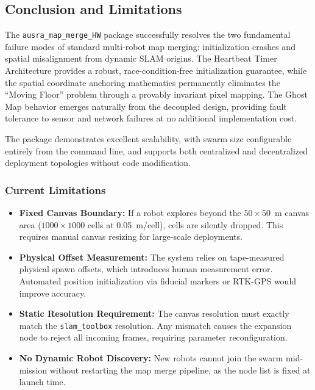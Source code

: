 \subsection{Conclusion and Limitations}
\label{subsec:map_merge_conclusion}

The \texttt{ausra\_map\_merge\_HW} package successfully resolves the two fundamental failure modes of standard multi-robot map merging: initialization crashes and spatial misalignment from dynamic SLAM origins. The Heartbeat Timer Architecture provides a robust, race-condition-free initialization guarantee, while the spatial coordinate anchoring mathematics permanently eliminates the ``Moving Floor'' problem through a provably invariant pixel mapping. The Ghost Map behavior emerges naturally from the decoupled design, providing fault tolerance to sensor and network failures at no additional implementation cost.

The package demonstrates excellent scalability, with swarm size configurable entirely from the command line, and supports both centralized and decentralized deployment topologies without code modification.

\subsubsection{Current Limitations}

\begin{itemize}
    \item \textbf{Fixed Canvas Boundary:} If a robot explores beyond the $50 \times 50$~m canvas area ($1000 \times 1000$ cells at 0.05~m/cell), cells are silently dropped. This requires manual canvas resizing for large-scale deployments.

    \item \textbf{Physical Offset Measurement:} The system relies on tape-measured physical spawn offsets, which introduces human measurement error. Automated position initialization via fiducial markers or RTK-GPS would improve accuracy.

    \item \textbf{Static Resolution Requirement:} The canvas resolution must exactly match the \texttt{slam\_toolbox} resolution. Any mismatch causes the expansion node to reject all incoming frames, requiring parameter reconfiguration.

    \item \textbf{No Dynamic Robot Discovery:} New robots cannot join the swarm mid-mission without restarting the map merge pipeline, as the node list is fixed at launch time.
\end{itemize}

